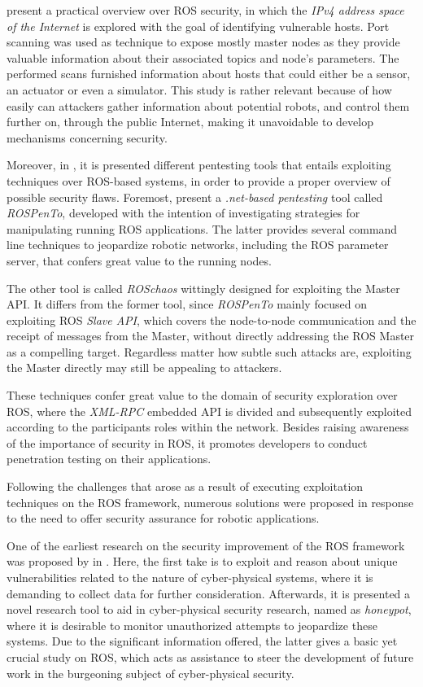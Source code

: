 \citeauthor*{8794451} present a practical overview over ROS security, in which the \textit{IPv4 address space of the Internet} is explored with the goal of identifying vulnerable hosts. Port scanning was used as technique to expose mostly master nodes as they provide valuable information about their associated topics and node's parameters. The performed scans furnished information about hosts that could either be a sensor, an actuator or even a simulator. This study is rather relevant because of how easily can attackers gather information about potential robots, and control them further on, through the public Internet, making it unavoidable to develop mechanisms concerning security. 

Moreover, in , it is presented different pentesting tools that entails exploiting techniques over ROS-based systems, in order to provide a proper overview of possible security flaws. Foremost, \citeauthor{dieber2020penetration} present a \textit{.net-based pentesting} tool called \textit{ROSPenTo}, developed with the intention of investigating strategies for manipulating running ROS applications. The latter provides several command line techniques to jeopardize robotic networks, including the ROS parameter server, that confers great value to the running nodes. 

The other tool is called \textit{ROSchaos} wittingly designed for exploiting the Master API. It differs from the former tool, since \textit{ROSPenTo} mainly focused on exploiting ROS \textit{Slave API}, which covers the node-to-node communication and the receipt of messages from the Master, without directly addressing the ROS Master as a compelling target. Regardless matter how subtle such attacks are, exploiting the Master directly may still be appealing to attackers. 

These techniques confer great value to the domain of security exploration over ROS, where the \textit{XML-RPC} embedded API is divided and subsequently exploited according to the participants roles within the network. Besides raising awareness of the importance of security in ROS, it promotes developers to conduct penetration testing on their applications.

Following the challenges that arose as a result of executing exploitation techniques on the ROS framework, numerous solutions were proposed in response to the need to offer security assurance for robotic applications. 

One of the earliest research on the security improvement of the ROS framework was proposed by \citeauthor{mcclean2013preliminary} in . Here, the first take is to exploit and reason about unique vulnerabilities related to the nature of cyber-physical systems, where it is demanding to collect data for further consideration. Afterwards, it is presented a novel research tool to aid in cyber-physical security research, named as \textit{honeypot}, where it is desirable to monitor unauthorized attempts to jeopardize these systems. Due to the significant information offered, the latter gives a basic yet crucial study on ROS, which acts as assistance to steer the development of future work in the burgeoning subject of cyber-physical security. 

